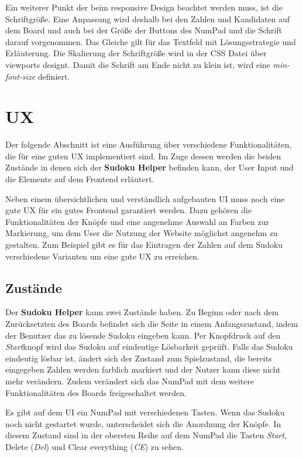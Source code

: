 Ein weiterer Punkt der beim responsive Design beachtet werden muss, ist die Schriftgröße. Eine Anpassung wird deshalb bei den Zahlen und Kandidaten auf dem Board und auch bei der Größe der Buttons des NumPad und die Schrift darauf vorgenommen. Das Gleiche gilt für das Textfeld mit Lösungsstrategie und Erläuterung. Die Skalierung der Schriftgröße wird in der \ac{CSS} Datei über viewports designt. Damit die Schrift am Ende nicht zu klein ist, wird eine \textit{min-font-size} definiert. 


\section{\acl{UX}}
Der folgende Abschnitt ist eine Ausführung über verschiedene Funktionalitäten, die für eine guten \acl{UX} implementiert sind. Im Zuge dessen werden die beiden Zustände in denen sich der \textbf{Sudoku Helper} befinden kann, der User Input und die Elemente auf dem Frontend erläutert.

Neben einem übersichtlichen und verständlich aufgebauten \ac{UI} muss noch eine gute \ac{UX} für ein gutes Frontend garantiert werden. Dazu gehören die Funktionalitäten der Knöpfe und eine angenehme Auswahl an Farben zur Markierung, um dem User die Nutzung der Website möglichst angenehm zu gestalten. Zum Beispiel gibt es für das Eintragen der Zahlen auf dem Sudoku verschiedene Varianten um eine gute \ac{UX} zu erreichen. 

\subsection{Zustände}

Der \textbf{Sudoku Helper} kann zwei Zustände haben. Zu Beginn oder nach dem Zurücksetzten des Boards befindet sich die Seite in einem Anfangszustand, indem der Benutzer das zu lösende Sudoku eingeben kann. Per Knopfdruck auf den \textit{Start}knopf wird das Sudoku auf eindeutige Lösbarkeit geprüft. Falls das Sudoku eindeutig lösbar ist, ändert sich der Zustand zum \glqq Spielzustand\grqq, die bereits eingegeben Zahlen werden farblich markiert und der Nutzer kann diese nicht mehr verändern. Zudem verändert sich das NumPad mit dem weitere Funktionalitäten des Boards freigeschaltet werden. 

Es gibt auf dem \ac{UI} ein NumPad mit verschiedenen Tasten. Wenn das Sudoku noch nicht gestartet wurde, unterscheidet sich die Anordnung der Knöpfe. In diesem Zustand sind in der obersten Reihe auf dem NumPad die Tasten \textit{Start}, Delete (\textit{Del}) und Clear everything (\textit{CE}) zu sehen. 


